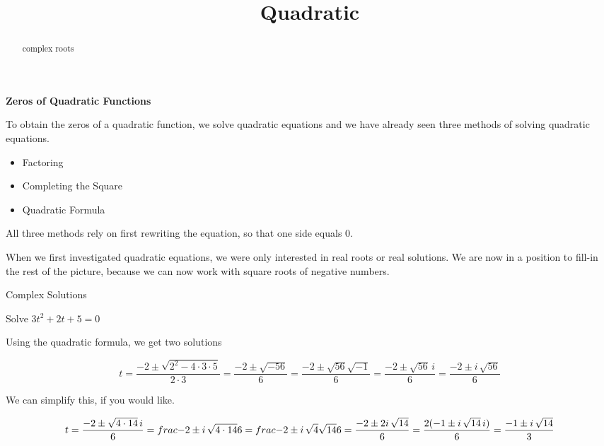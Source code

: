 \documentclass{ximera}
\title{Quadratic}
\begin{document}
\begin{abstract}
complex roots
\end{abstract}
\maketitle



\textbf{\textcolor{blue!55!black}{Zeros of Quadratic Functions}}


To obtain the zeros of a quadratic function, we solve quadratic equations and we have already seen three methods of solving quadratic equations.

\begin{itemize}
	\item Factoring
	\item Completing the Square
	\item Quadratic Formula
	\end{itemize}


All three methods rely on first rewriting the equation, so that one side equals $0$.

When we first investigated quadratic equations, we were only interested in real roots or real solutions.  We are now in a position to fill-in the rest of the picture, because we can now work with square roots of negative numbers.


\begin{example} Complex Solutions

Solve $3t^2 + 2t + 5 = 0$

Using the quadratic formula, we get two solutions

\[  t = \frac{-2 \pm \sqrt{2^2 - 4 \cdot 3 \cdot 5}}{2 \cdot 3}   =  \frac{-2 \pm \sqrt{-56}}{6}  =  \frac{-2 \pm \sqrt{56}\sqrt{-1}}{6}   =  \frac{-2 \pm \sqrt{56} \, i}{6}  =  \frac{-2 \pm i \,\sqrt{56}}{6}   \]



We can simplify this, if you would like.


\[  t = \frac{-2 \pm \sqrt{4 \cdot 14} \, i}{6}  = \\frac{-2 \pm i \, \sqrt{4 \cdot 14}}{6}  =  frac{-2 \pm i \,\sqrt{4} \sqrt{14}}{6} = \frac{-2 \pm 2 i \, \sqrt{14}}{6} = \frac{2(-1 \pm i \,\sqrt{14} \, i)}{6}   = \frac{-1 \pm i \,\sqrt{14}}{3}   \]



\end{example}
\end{document}
